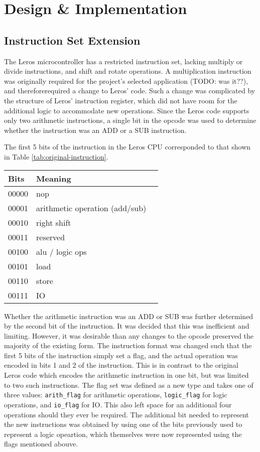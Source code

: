\section{Design \& Implementation}
\subsection{Instruction Set Extension}
The Leros microcontroller has a restricted instruction set, lacking multiply
or divide instructions, and shift and rotate operations. A multiplication
instruction was originally required for the
project's selected application (TODO: was it??), and thereforerequired a
change to Leros' code. Such a change was complicated by the structure of
Leros' instruction
register, which did not have room for the additional logic to accommodate
new
operations. Since the Leros code supports only two arithmetic instructions,
a single bit in the opcode was used to determine whether the instruction
was an ADD or a SUB instruction.

The first 5 bits of the instruction in the Leros CPU
corresponded to that shown
in Table \ref{tab:original-instruction}.
\begin{table}
\begin{tabular}{|p{}|p{}|p{}|}
\hline
\textbf{Bits} & Meaning \\
\hline
00000 & nop \\
00001 & arithmetic operation (add/sub) \\
00010 & right shift \\
00011 & reserved \\
00100 & alu / logic ops \\
00101 & load \\
00110 & store \\
00111 & IO \\
\hline
\end{tabular}
\end{table}

Whether the arithmetic instruction was an ADD or SUB was further determined by
the second bit of the instruction. It was decided that this was inefficient and
limiting. However, it was desirable than any changes to the opcode preserved the
majority of the existing form. The instruction format was changed such that the
first 5 bits of the instruction simply set a flag, and the actual operation was
encoded in bits 1 and 2 of the instruction. This is in contrast to the original
Leros code which encodes the arithmetic instruction in one bit, but was limited
to two such instructions. The flag set was defined as a new type and takes one
of three values: \texttt{arith\_flag} for arithmetic operations,
\texttt{logic\_flag} for logic operations, and  \texttt{io\_flag} for IO. This
also left space for an additional four operations should they ever be required.
The additional bit needed to represent the new instructions was obtained by using
one of the bits previously used to represent a logic opeartion, which themselves
were now represented using the flags mentioned abouve.

